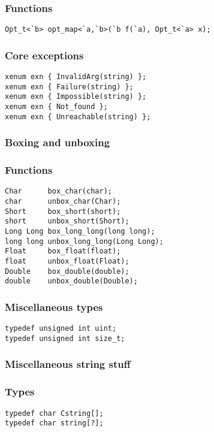 \subsubsection*{Functions}
\begin{verbatim}
Opt_t<`b> opt_map<`a,`b>(`b f(`a), Opt_t<`a> x);
\end{verbatim}

\subsubsection*{Core exceptions}
\begin{verbatim}
xenum exn { InvalidArg(string) };
xenum exn { Failure(string) };
xenum exn { Impossible(string) };
xenum exn { Not_found };
xenum exn { Unreachable(string) };
\end{verbatim}

\subsubsection*{Boxing and unboxing}
\subsubsection*{Functions}
\begin{verbatim}
Char      box_char(char);
char      unbox_char(Char);
Short     box_short(short);
short     unbox_short(Short);
Long Long box_long_long(long long);
long long unbox_long_long(Long Long);
Float     box_float(float);
float     unbox_float(Float);
Double    box_double(double);
double    unbox_double(Double);
\end{verbatim}

\subsubsection*{Miscellaneous types}
\begin{verbatim}
typedef unsigned int uint;
typedef unsigned int size_t;
\end{verbatim}

\subsubsection*{Miscellaneous string stuff}
\subsubsection*{Types}
\begin{verbatim}
typedef char Cstring[];
typedef char string[?];
\end{verbatim}

